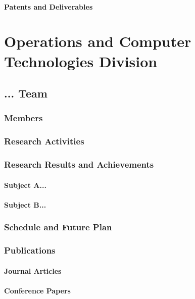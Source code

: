 \documentclass{book}
\begin{document}
\subsection{Patents and Deliverables}

\part{Operations and Computer Technologies Division}

\chapter{... Team}

\section{Members}

\section{Research Activities}

\section{Research Results and Achievements}

\subsection{Subject A...}

\subsection{Subject B...}

\section{Schedule and Future Plan}

\section{Publications}

\subsection{Journal Articles}

\subsection{Conference Papers}
\end{document}
